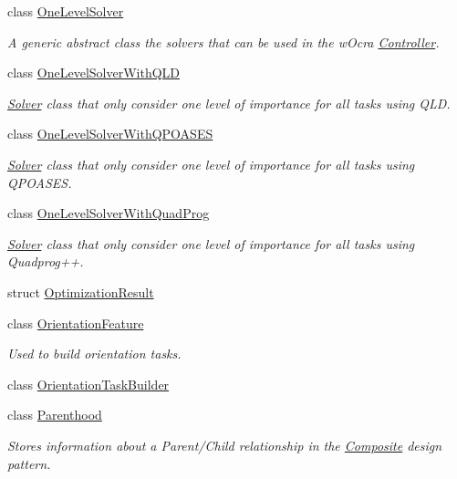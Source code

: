 \begin{DoxyCompactItemize}
\item 
class \hyperlink{classocra_1_1OneLevelSolver}{One\+Level\+Solver}
\begin{DoxyCompactList}\small\item\em A generic abstract class the solvers that can be used in the w\+Ocra \hyperlink{classocra_1_1Controller}{Controller}. \end{DoxyCompactList}\item 
class \hyperlink{classocra_1_1OneLevelSolverWithQLD}{One\+Level\+Solver\+With\+Q\+LD}
\begin{DoxyCompactList}\small\item\em \hyperlink{classocra_1_1Solver}{Solver} class that only consider one level of importance for all tasks using Q\+LD. \end{DoxyCompactList}\item 
class \hyperlink{classocra_1_1OneLevelSolverWithQPOASES}{One\+Level\+Solver\+With\+Q\+P\+O\+A\+S\+ES}
\begin{DoxyCompactList}\small\item\em \hyperlink{classocra_1_1Solver}{Solver} class that only consider one level of importance for all tasks using Q\+P\+O\+A\+S\+ES. \end{DoxyCompactList}\item 
class \hyperlink{classocra_1_1OneLevelSolverWithQuadProg}{One\+Level\+Solver\+With\+Quad\+Prog}
\begin{DoxyCompactList}\small\item\em \hyperlink{classocra_1_1Solver}{Solver} class that only consider one level of importance for all tasks using Quadprog++. \end{DoxyCompactList}\item 
struct \hyperlink{structocra_1_1OptimizationResult}{Optimization\+Result}
\item 
class \hyperlink{classocra_1_1OrientationFeature}{Orientation\+Feature}
\begin{DoxyCompactList}\small\item\em Used to build orientation tasks. \end{DoxyCompactList}\item 
class \hyperlink{classocra_1_1OrientationTaskBuilder}{Orientation\+Task\+Builder}
\item 
class \hyperlink{classocra_1_1Parenthood}{Parenthood}
\begin{DoxyCompactList}\small\item\em Stores information about a Parent/\+Child relationship in the \hyperlink{classocra_1_1Composite}{Composite} design pattern. \end{DoxyCompactList}\item 

\end{DoxyCompactItemize}
